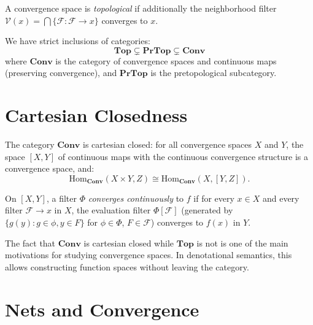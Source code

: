 \begin{definition}
A convergence space is \emph{topological} if additionally the neighborhood filter
$\mathcal{V}(x) = \bigcap\{\mathcal{F} : \mathcal{F} \to x\}$ converges to $x$.
\end{definition}

\begin{theorem}[Hierarchy]
We have strict inclusions of categories:
\[
  \mathbf{Top} \subsetneq \mathbf{PrTop} \subsetneq \mathbf{Conv}
\]
where $\mathbf{Conv}$ is the category of convergence spaces and continuous maps
(preserving convergence), and $\mathbf{PrTop}$ is the pretopological subcategory.
\end{theorem}

\section{Cartesian Closedness}

\begin{theorem}
The category $\mathbf{Conv}$ is cartesian closed: for all convergence spaces $X$ and $Y$,
the space $[X,Y]$ of continuous maps with the continuous convergence structure is a
convergence space, and:
\[
  \mathrm{Hom}_{\mathbf{Conv}}(X \times Y, Z) \cong
  \mathrm{Hom}_{\mathbf{Conv}}(X, [Y, Z]).
\]
\end{theorem}

\begin{definition}
On $[X,Y]$, a filter $\Phi$ \emph{converges continuously} to $f$ if for every $x \in X$
and every filter $\mathcal{F} \to x$ in $X$, the evaluation filter $\Phi[\mathcal{F}]$
(generated by $\{g(y) : g \in \phi, y \in F\}$ for $\phi \in \Phi$,
$F \in \mathcal{F}$) converges to $f(x)$ in $Y$.
\end{definition}

\begin{remark}
The fact that $\mathbf{Conv}$ is cartesian closed while $\mathbf{Top}$ is not is one of
the main motivations for studying convergence spaces. In denotational semantics, this
allows constructing function spaces without leaving the category.
\end{remark}

\section{Nets and Convergence}

